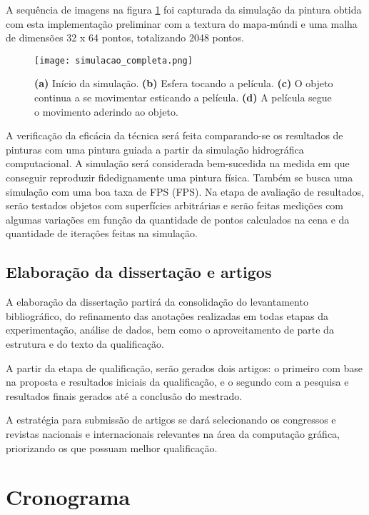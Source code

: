 A sequência de imagens na figura \ref{fig:simulacao} foi capturada da simulação da pintura obtida com esta implementação preliminar com a textura do mapa-múndi e uma malha de dimensões 32 x 64 pontos, totalizando 2048 pontos. 

\begin{figure}
\begin{center} 
\texttt{[image: simulacao\_completa.png]}
\caption{\textbf{(a)} Início da simulação. \textbf{(b)} Esfera tocando a película. \textbf{(c)} O objeto continua a se movimentar esticando a película. \textbf{(d)} A película segue o movimento aderindo ao objeto. }
\label{fig:simulacao}
\end{center} 
\end{figure}

A verificação da eficácia da técnica será feita comparando-se os resultados de pinturas com uma pintura guiada a partir da simulação hidrográfica computacional. A simulação será considerada bem-sucedida na medida em que conseguir reproduzir fidedignamente uma pintura física. Também se busca uma simulação com uma boa taxa de \acs{FPS} (\acl{FPS}). Na etapa de avaliação de resultados, serão testados objetos com superfícies arbitrárias e serão feitas medições com algumas variações em função da quantidade de pontos calculados na cena e da quantidade de iterações feitas na simulação.

\subsection{Elaboração da dissertação e artigos}

A elaboração da dissertação partirá da consolidação do levantamento bibliográfico, do refinamento das anotações realizadas em todas etapas da experimentação, análise de dados, bem como o aproveitamento de parte da estrutura e do texto da qualificação.

A partir da etapa de qualificação, serão gerados dois artigos: o primeiro com base na proposta e resultados iniciais da qualificação, e o segundo com a pesquisa e resultados finais gerados até a conclusão do mestrado.

A estratégia para submissão de artigos se dará selecionando os congressos e revistas nacionais e internacionais relevantes na área da computação gráfica, priorizando os que possuam melhor qualificação.

\section{Cronograma}

